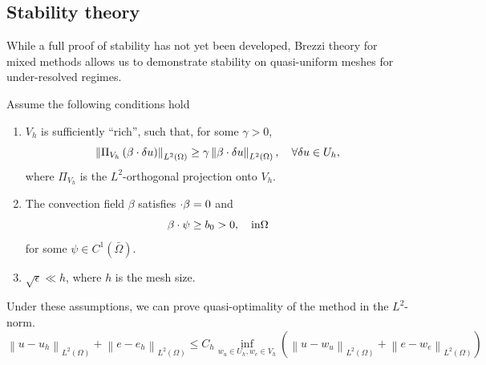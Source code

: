 \documentclass[final,leqno]{siamltex}
\newcommand{\nor}[1]{\left\| #1 \right\|}
\newcommand{\LRp}[1]{\left( #1 \right)}
\renewcommand{\L}{L^2\LRp{\Omega}}
\let\grad\relax
\newcommand{\grad}{\nabla}
\renewcommand{\div}{\grad \cdot}
\begin{document}
\subsection{Stability theory}
While a full proof of stability has not yet been developed, Brezzi theory for mixed methods \cite{BabuskaEquivBrezzi} allows us to demonstrate stability on quasi-uniform meshes for under-resolved regimes.  
\begin{lemma}
Assume the following conditions hold
\begin{enumerate}
\item $V_h$ is sufficiently ``rich'', such that, for some $\gamma > 0$, 
$$\nor{\Pi_{V_h}\LRp{\beta\cdot \grad\delta u}}_{\L} \geq \gamma \nor{\beta\cdot \grad\delta u}_{\L},\quad \forall \delta u\in U_h,$$
where $\Pi_{V_h}$ is the $L^2$-orthogonal projection onto $V_h$.  
\item The convection field $\beta$ satisfies $\div \beta = 0$ and
\[
\beta\cdot \grad \psi \geq b_0 > 0, \quad {\rm in} \Omega
\]
for some $\psi\in C^1(\bar{\Omega})$.
\item $\sqrt{\epsilon} \ll h$, where $h$ is the mesh size.
\end{enumerate}
Under these assumptions, we can prove quasi-optimality of the method in the $L^2$-norm.
\[
\nor{u-u_h}_{\L} + \nor{e-e_h}_{\L} \leq C_h \inf_{w_u\in U_h, w_e\in V_h}\LRp{\nor{u-w_u}_{\L} + \nor{e-w_e}_{\L}}
\]
\end{lemma}
\end{document}
